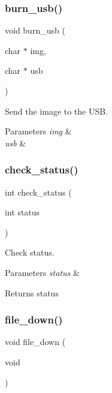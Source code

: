 \subsubsection{burn\+\_\+usb()}
{\footnotesize\ttfamily void burn\+\_\+usb (\begin{DoxyParamCaption}\item[{char $\ast$}]{img,  }\item[{char $\ast$}]{usb }\end{DoxyParamCaption})}



Send the image to the U\+SB. 


\begin{DoxyParams}{Parameters}
{\em img} & \\
\hline
{\em usb} & \\
\hline
\end{DoxyParams}
\mbox{\label{client_8h_af8b753753a0d32bcef5a40e1a49b7a18}} 
\subsubsection{check\+\_\+status()}
{\footnotesize\ttfamily int check\+\_\+status (\begin{DoxyParamCaption}\item[{int}]{status }\end{DoxyParamCaption})}



Check status. 


\begin{DoxyParams}{Parameters}
{\em status} & \\
\hline
\end{DoxyParams}
\begin{DoxyReturn}{Returns}
status 
\end{DoxyReturn}
\mbox{\label{client_8h_aacd5c156cb2388028cddb5242f1fe5c2}} 
\subsubsection{file\+\_\+down()}
{\footnotesize\ttfamily void file\+\_\+down (\begin{DoxyParamCaption}\item[{void}]{ }\end{DoxyParamCaption})}



